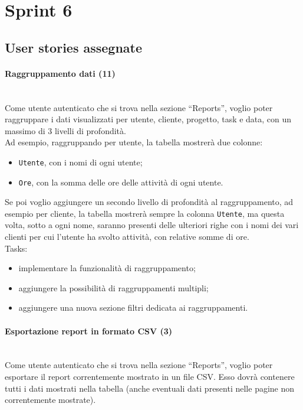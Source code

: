 
\section{Sprint 6}
\label{sec:sprint6}

\subsection{User stories assegnate}
\paragraph{Raggruppamento dati (11)}\mbox{} \\[\baselineskip]
Come utente autenticato che si trova nella sezione “Reports”, voglio poter raggruppare i dati visualizzati per utente, cliente, progetto, task e data, con un massimo di 3 livelli di profondità.\\
Ad esempio, raggruppando per utente, la tabella mostrerà due colonne:
\begin{itemize}
  \item \texttt{Utente}, con i nomi di ogni utente;
  \item \texttt{Ore}, con la somma delle ore delle attività di ogni utente.
\end{itemize}
Se poi voglio aggiungere un secondo livello di profondità al raggruppamento, ad esempio per cliente, la tabella mostrerà sempre la colonna \texttt{Utente}, ma questa volta, sotto a ogni nome, saranno presenti delle ulteriori righe con i nomi dei vari clienti per cui l'utente ha svolto attività, con relative somme di ore.\\

\noindent Tasks:
\begin{itemize}
  \item implementare la funzionalità di raggruppamento;
  \item aggiungere la possibilità di raggruppamenti multipli;
  \item aggiungere una nuova sezione filtri dedicata ai raggruppamenti.
\end{itemize}

\paragraph{Esportazione report in formato CSV (3)}\mbox{} \\[\baselineskip]
Come utente autenticato che si trova nella sezione “Reports”, voglio poter esportare il report correntemente mostrato in un file CSV. 
Esso dovrà contenere tutti i dati mostrati nella tabella (anche eventuali dati presenti nelle pagine non correntemente mostrate).\\

